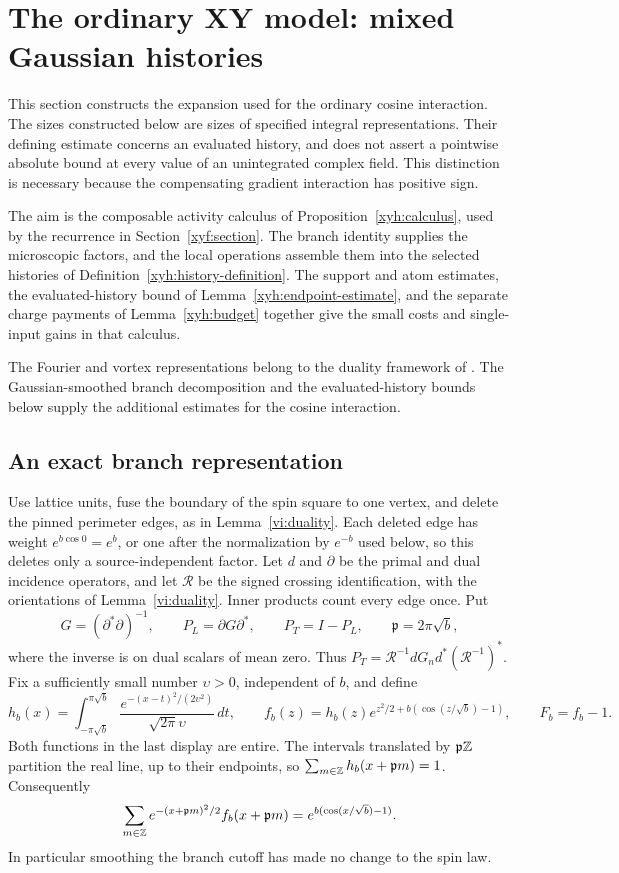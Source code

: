 \section{The ordinary XY model: mixed Gaussian histories}
\label{xyh:section}

This section constructs the expansion used for the ordinary cosine interaction.
The sizes constructed below are sizes of specified integral representations.
Their defining estimate concerns an evaluated history, and does not assert a
pointwise absolute bound at every value of an unintegrated complex field.
This distinction is necessary because the compensating gradient interaction
has positive sign.

The aim is the composable activity calculus of
Proposition~\ref{xyh:calculus}, used by the recurrence in
Section~\ref{xyf:section}.  The branch identity supplies the
microscopic factors, and the local operations assemble them into the
selected histories of Definition~\ref{xyh:history-definition}.
The support and atom estimates, the evaluated-history bound of
Lemma~\ref{xyh:endpoint-estimate}, and the separate charge payments
of Lemma~\ref{xyh:budget} together give the small costs and
single-input gains in that calculus.

The Fourier and vortex representations belong to the duality
framework of \citet{JoseKadanoffKirkpatrickNelson1977}.
The Gaussian-smoothed branch decomposition and the evaluated-history
bounds below supply the additional estimates for the cosine interaction.

\subsection{An exact branch representation}

Use lattice units, fuse the boundary of the spin square to one vertex,
and delete the pinned perimeter edges, as in Lemma~\ref{vi:duality}.
Each deleted edge has weight $e^{b\cos0}=e^b$, or one after the
normalization by $e^{-b}$ used below, so this deletes only a
source-independent factor.
Let $d$ and $\partial$ be the primal and dual incidence operators, and let
$\mathcal R$ be the signed crossing identification, with the orientations of
Lemma~\ref{vi:duality}. Inner products count every edge once. Put
\[
 G=(\partial^*\partial)^{-1},\qquad
 P_L=\partial G\partial^*,\qquad P_T=I-P_L,
 \qquad \mathfrak p=2\pi\sqrt b,
\]
where the inverse is on dual scalars of mean zero. Thus
$P_T=\mathcal R^{-1}dG_n d^*(\mathcal R^{-1})^*$.
Fix a sufficiently small number $\upsilon>0$, independent of $b$, and define
\[
 h_b(x)=\int_{-\pi\sqrt b}^{\pi\sqrt b}
 \frac{e^{-(x-t)^2/(2\upsilon^2)}}{\sqrt{2\pi}\upsilon}\,dt,
 \qquad
 f_b(z)=h_b(z)e^{z^2/2+b(\cos(z/\sqrt b)-1)},\qquad F_b=f_b-1.
\]
Both functions in the last display are entire. The intervals translated by
$\mathfrak p\mathbb Z$ partition the real line, up to their endpoints, so
$\sum_{m\in\mathbb Z}h_b(x+\mathfrak p m)=1$. Consequently
\begin{equation}\label{xyh:periodization}
 \sum_{m\in\mathbb Z} e^{-(x+\mathfrak p m)^2/2}
 f_b(x+\mathfrak p m)=e^{b(\cos(x/\sqrt b)-1)}.
\end{equation}
In particular smoothing the branch cutoff has made no change to the spin
law.

